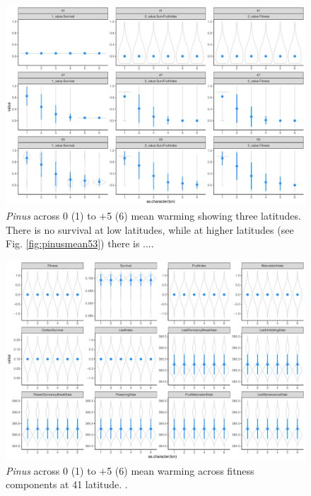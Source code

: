 \documentclass[11pt,letter]{article}
\begin{document}
\begin{figure} 
 \begin{center}
\noindent \includegraphics[width=1\textwidth]{..//analyses/graphs/phenofit/sims/metrics3/meansim_3metricsPS.pdf}
  \caption{\emph{Pinus} across 0 (1) to $+$5 (6) mean warming showing three latitudes. There is no survival at low latitudes, while at higher latitudes (see Fig. \ref{fig:pinusmean53}) there is ....}
  \label{fig:pinusmean3}
  \end{center}
\end{figure}

\begin{figure} 
 \begin{center}
\noindent \includegraphics[width=1\textwidth]{..//analyses/graphs/phenofit/sims/meansim41_allmetricsPS.pdf}
  \caption{\emph{Pinus} across 0 (1) to $+$5 (6) mean warming across fitness components at 41 latitude. .}
  \label{fig:pinusmean41}
  \end{center}
\end{figure}
\end{document}
